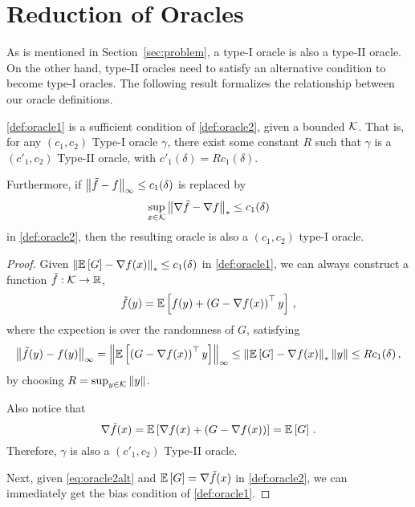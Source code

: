 
\section{Reduction of Oracles}
\label{sec:orrel}

As is mentioned in Section~\ref{sec:problem}, a type-I oracle is also a type-II oracle. On the other hand, type-II oracles need to satisfy an alternative condition to become type-I oracles. The following result formalizes the relationship between our oracle definitions.
\begin{theorem}\label{thm:typered}
\cref{def:oracle1} is a sufficient condition of \cref{def:oracle2}, given a bounded $\mathcal{K}$. That is, for any $(c_1,c_2)$ Type-I oracle $\gamma$, there exist some constant $R$ such that  $\gamma$ is a $(c'_1,c_2)$ Type-II oracle, with $c'_1(\delta)=Rc_1(\delta)$.

Furthermore, if $\left\|\tilde{f}-f\right\|_\infty \le c_1(\delta)$ is replaced by 
\begin{align}
\label{eq:oracle2alt}
\sup_{x\in \mathcal{K}}\left\|\nabla \tilde{f}- \nabla f\right\|_* \le c_1(\delta)
\end{align}
in \cref{def:oracle2}, then the resulting oracle is also a $(c_1,c_2)$ type-I oracle.
\end{theorem}

\begin{proof}
Given $\left\| \mathbb{E}\left[G\right]  - \nabla f(x)  \right\|_* \le c_1(\delta) $ in \cref{def:oracle1}, we can always construct a function $\tilde{f}:\mathcal{K} \to \mathbb{R}$,
\[
\tilde{f}(y) =\mathbb{E}\left[ f(y)+ \left( G-\nabla f(x) \right)^\top y\right] \,,
\]
where the expection is over the randomness of $G$, satisfying
\begin{align*}
\left\|\tilde{f}(y)-f(y)\right\|_{\infty}
=
 \left\| \mathbb{E}\left[\left( G-\nabla f(x) \right)^\top y\right]\right\|_{\infty}
 \le \left\|\mathbb{E}\left[G\right]-\nabla f(x)\right\|_* \left\|y\right\|
 \le  Rc_1(\delta)\,,
\end{align*}
by choosing $R = \sup_{y \in \mathcal{K}}\left\|y\right\|$.

Also notice that
\[
 \nabla \tilde{f}(x) = \mathbb{E}\left[\nabla f(x)+ \left( G-\nabla f(x)\right)\right]
 =\mathbb{E}\left[G\right]\,.
\]
Therefore, $\gamma$ is also a $(c'_1,c_2)$ Type-II oracle.

Next, given \eqref{eq:oracle2alt} and $\mathbb{E}\left[G\right]=\nabla \tilde{f}(x)$ in \cref{def:oracle2}, we can immediately get the bias condition of \cref{def:oracle1}.
\end{proof}


